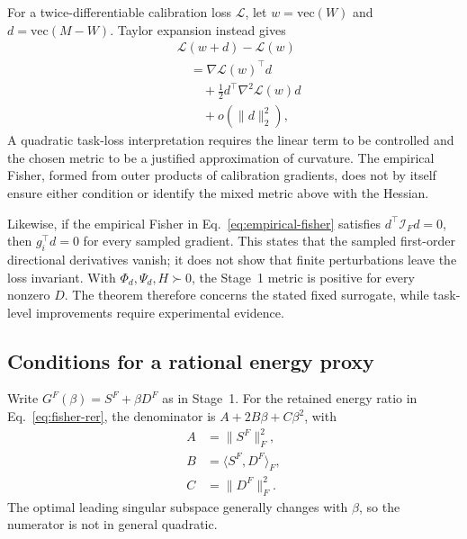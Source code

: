 For a twice-differentiable calibration loss $\mathcal L$, let $w=\mathrm{vec}(W)$ and $d=\mathrm{vec}(M-W)$. Taylor expansion instead gives
\begin{equation}
\begin{aligned}
&\mathcal L(w+d)-\mathcal L(w)\\
&\quad=\nabla\mathcal L(w)^\top d \\
&\qquad+\tfrac12 d^\top\nabla^2\mathcal L(w)d\\
&\qquad+o(\|d\|_2^2),
\end{aligned}
\end{equation}
A quadratic task-loss interpretation requires the linear term to be controlled and the chosen metric to be a justified approximation of curvature. The empirical Fisher, formed from outer products of calibration gradients, does not by itself ensure either condition or identify the mixed metric above with the Hessian.

Likewise, if the empirical Fisher in Eq.~\eqref{eq:empirical-fisher} satisfies $d^\top\mathcal I_Fd=0$, then $g_i^\top d=0$ for every sampled gradient. This states that the sampled first-order directional derivatives vanish; it does not show that finite perturbations leave the loss invariant. With $\Phi_d,\Psi_d,H\succ0$, the Stage~1 metric is positive for every nonzero $D$. The theorem therefore concerns the stated fixed surrogate, while task-level improvements require experimental evidence.

\subsection{Conditions for a rational energy proxy}\label{sup:beta-proxy}

Write $G^F(\beta)=S^F+\beta D^F$ as in Stage~1. For the retained energy ratio in Eq.~\eqref{eq:fisher-rer}, the denominator is $A+2B\beta+C\beta^2$, with
\begin{equation}
\begin{aligned}
A&=\|S^F\|_F^2,\\
B&=\langle S^F,D^F\rangle_F,\\
C&=\|D^F\|_F^2.
\end{aligned}
\end{equation}
The optimal leading singular subspace generally changes with $\beta$, so the numerator is not in general quadratic.

